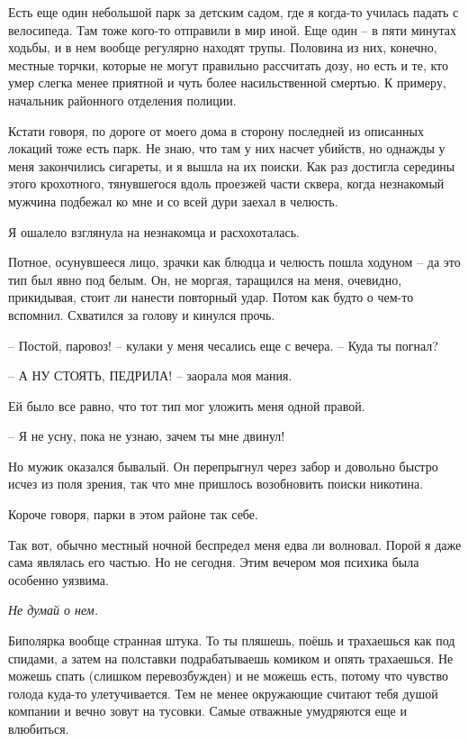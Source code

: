 \documentclass[
]{book}
\begin{document}
Есть еще один небольшой парк за детским садом, где я когда-то училась падать с велосипеда. Там тоже кого-то отправили в мир иной. Еще один -- в пяти минутах ходьбы, и в нем вообще регулярно находят трупы. Половина из них, конечно, местные торчки, которые не могут правильно рассчитать дозу, но есть и те, кто умер слегка менее приятной и чуть более насильственной смертью. К примеру, начальник районного отделения полиции.

Кстати говоря, по дороге от моего дома в сторону последней из описанных локаций тоже есть парк. Не знаю, что там у них насчет убийств, но однажды у меня закончились сигареты, и я вышла на их поиски. Как раз достигла середины этого крохотного, тянувшегося вдоль проезжей части сквера, когда незнакомый мужчина подбежал ко мне и со всей дури заехал в челюсть.

Я ошалело взглянула на незнакомца и расхохоталась.

Потное, осунувшееся лицо, зрачки как блюдца и челюсть пошла ходуном -- да это тип был явно под белым. Он, не моргая, таращился на меня, очевидно, прикидывая, стоит ли нанести повторный удар. Потом как будто о чем-то вспомнил. Схватился за голову и кинулся прочь.

-- Постой, паровоз! -- кулаки у меня чесались еще с вечера. -- Куда ты погнал?

-- А НУ СТОЯТЬ, ПЕДРИЛА! -- заорала моя мания.

Ей было все равно, что тот тип мог уложить меня одной правой.

-- Я не усну, пока не узнаю, зачем ты мне двинул!

Но мужик оказался бывалый. Он перепрыгнул через забор и довольно быстро исчез из поля зрения, так что мне пришлось возобновить поиски никотина.

Короче говоря, парки в этом районе так себе.

Так вот, обычно местный ночной беспредел меня едва ли волновал. Порой я даже сама являлась его частью. Но не сегодня. Этим вечером моя психика была особенно уязвима.

\emph{Не думай о нем.}

Биполярка вообще странная штука. То ты пляшешь, поёшь и трахаешься как под спидами, а затем на полставки подрабатываешь комиком и опять трахаешься. Не можешь спать (слишком перевозбужден) и не можешь есть, потому что чувство голода куда-то улетучивается. Тем не менее окружающие считают тебя душой компании и вечно зовут на тусовки. Самые отважные умудряются еще и влюбиться.
\end{document}

